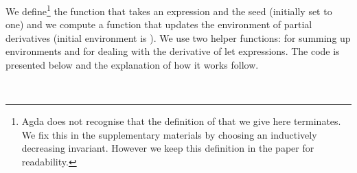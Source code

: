 We define\footnote{Agda does not recognise that the definition of  that
we give here terminates.  We fix this in the supplementary materials by choosing
an inductively decreasing invariant.  However we keep this definition in the
paper for readability.} the function  that takes an expression 
and the seed (initially set to one) and we compute a function that
updates the environment of partial derivatives (initial environment is ).
We use two helper functions:  for summing up environments and 
for dealing with the derivative of let expressions.  The code is presented
below and the explanation of how it works follow.
\begin{code}[hide]%
%
\>[2]\AgdaSymbol{\{-\#}\AgdaSpace{}%
\AgdaSpace{}%
\AgdaSymbol{\#-\}}%
\>[23]\<%
\\
%
\>[23]\<%
\end{code}
